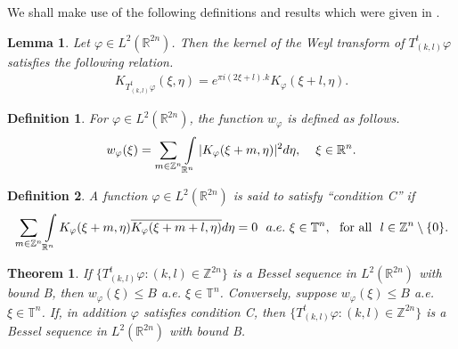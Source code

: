 \documentclass[a4paper,12pt,reqno]{amsart}
\theoremstyle{plain}
\newtheorem{thm}{Theorem}[section]
\numberwithin{equation}{section}
\newtheorem{lem}{Lemma}[section]
\newtheorem{defn}{Definition}[section]
\theoremstyle{definition}
\begin{document}
We shall make use of the following definitions and results which were given in \cite{ras}.
\begin{lem}
Let $\varphi \in L^{2}(\mathbb {R}^{2n})$. Then the kernel of the Weyl transform of $T_{(k,l)}^{t}\varphi$ satisfies the following relation.
\begin{eqnarray}\label{3peq1}
K_{T_{(k,l)}^{t}\varphi}(\xi,\eta)=e^{\pi i (2\xi+l).k}K_{\varphi}(\xi+l,\eta).
\end{eqnarray}
\end{lem}
\begin{defn}
For $\varphi\in L^{2}(\mathbb{R}^{2n})$, the function $w_{\varphi}$ is defined as follows.
\begin{eqnarray*}
w_{\varphi}(\xi)=\sum\limits_{m\in \mathbb{Z}^{n}}\int\limits_{\mathbb{R}^{n}}| K_{\varphi}(\xi+m,\eta)|^{2} d\eta,\hspace{4 mm} \xi\in \mathbb{R}^{n}.
\end{eqnarray*}
\end{defn}
\begin{defn}
A function $\varphi \in L^{2}(\mathbb {R}^{2n})$ is said to satisfy ``condition C'' if
\begin{eqnarray*}
\sum\limits_{m\in\mathbb {Z}^{n}}\int\limits_{\mathbb {R}^{n}}K_{\varphi}(\xi+m,\eta)\overline{K_{\varphi}(\xi+m+l,\eta)}d\eta=0 ~~ a.e.~ \xi\in \mathbb {T}^{n}, ~~{\rm for~ all} ~~l\in\mathbb{Z}^{n}\setminus \{0\}.
\end{eqnarray*}
\end{defn}
\begin{thm}\label{3pth10} \cite{ras}
If $\{T_{(k,l)}^{t}\varphi:(k,l)\in\mathbb {Z}^{2n}\}$ is a Bessel sequence in $L^{2}(\mathbb {R}^{2n})$ with bound B, then $w_{\varphi}(\xi)\leq B$ a.e. $\xi\in\mathbb {T}^{n}$. Conversely, suppose  $w_{\varphi}(\xi)\leq B$ a.e. $\xi\in\mathbb {T}^{n}$. If, in addition $\varphi$ satisfies condition C, then $\{T_{(k,l)}^{t}\varphi:(k,l)\in\mathbb {Z}^{2n}\}$ is a Bessel sequence in $L^{2}(\mathbb {R}^{2n})$ with bound B.
\end{thm}
\end{document}
